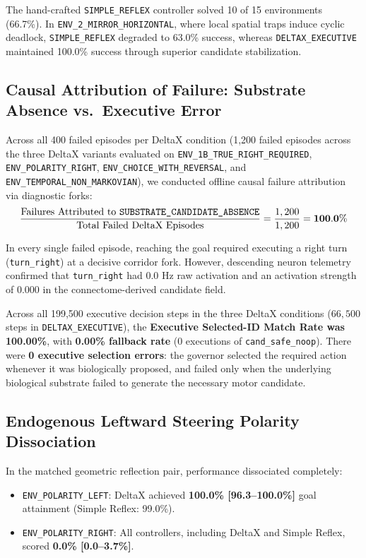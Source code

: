 \documentclass[10pt,letterpaper]{article}
\begin{document}
The hand-crafted \texttt{SIMPLE\_REFLEX} controller solved 10 of 15 environments (66.7\%). In \texttt{ENV\_2\_MIRROR\_HORIZONTAL}, where local spatial traps induce cyclic deadlock, \texttt{SIMPLE\_REFLEX} degraded to 63.0\% success, whereas \texttt{DELTAX\_EXECUTIVE} maintained 100.0\% success through superior candidate stabilization.

\subsection{Causal Attribution of Failure: Substrate Absence vs.\ Executive Error}

Across all 400 failed episodes per DeltaX condition (1,200 failed episodes across the three DeltaX variants evaluated on \texttt{ENV\_1B\_TRUE\_RIGHT\_REQUIRED}, \texttt{ENV\_POLARITY\_RIGHT}, \texttt{ENV\_CHOICE\_WITH\_REVERSAL}, and \texttt{ENV\_TEMPORAL\_NON\_MARKOVIAN}), we conducted offline causal failure attribution via diagnostic forks:
\begin{equation}
\frac{\text{Failures Attributed to \texttt{SUBSTRATE\_CANDIDATE\_ABSENCE}}}{\text{Total Failed DeltaX Episodes}} = \frac{1,200}{1,200} = \mathbf{100.0\%}
\end{equation}

In every single failed episode, reaching the goal required executing a right turn (\texttt{turn\_right}) at a decisive corridor fork. However, descending neuron telemetry confirmed that \texttt{turn\_right} had $0.0\text{ Hz}$ raw activation and an activation strength of $0.000$ in the connectome-derived candidate field. 

Across all 199,500 executive decision steps in the three DeltaX conditions ($66,500$ steps in \texttt{DELTAX\_EXECUTIVE}), the \textbf{Executive Selected-ID Match Rate was 100.00\%}, with \textbf{0.00\% fallback rate} ($0$ executions of \texttt{cand\_safe\_noop}). There were \textbf{0 executive selection errors}: the governor selected the required action whenever it was biologically proposed, and failed only when the underlying biological substrate failed to generate the necessary motor candidate.

\subsection{Endogenous Leftward Steering Polarity Dissociation}

In the matched geometric reflection pair, performance dissociated completely:
\begin{itemize}
    \item \texttt{ENV\_POLARITY\_LEFT}: DeltaX achieved \textbf{100.0\% [96.3--100.0\%]} goal attainment (Simple Reflex: 99.0\%).
    \item \texttt{ENV\_POLARITY\_RIGHT}: All controllers, including DeltaX and Simple Reflex, scored \textbf{0.0\% [0.0--3.7\%]}.
\end{itemize}
\end{document}
